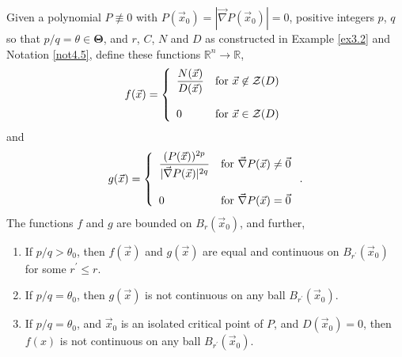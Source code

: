 \documentclass[10pt,a4paper]{amsart}
\newcommand{\re}{\mathbb{R}}
\newcommand{\vv}{\mathcal{Z}}
\begin{document}
\begin{thm}\label{thm3.3}
  Given a polynomial $P\not\equiv0$ with $P(\vec x_0)=|\vec\nabla P(\vec x_0)|=0$, positive integers $p$, $q$ so that  $p/q=\theta\in{\mathbf\Theta}$, and $r$, $C$, $N$ and $D$ as constructed in Example {\rm{\ref{ex3.2}}} and Notation {\rm{\ref{not4.5}}}, define these functions $\re^n\to\re$,
    $$f(\vec x)=\left\{\begin{array}{ll}{\displaystyle{\frac{N(\vec x)}{D(\vec x)}}} & \mbox{\rm{for} $\vec x\not\in\vv(D)$}\\ & \\0& \mbox{\rm{for} $\vec x\in\vv(D)$} \end{array}\right.$$
and 
$$g(\vec x)=\left\{\begin{array}{ll}{\displaystyle{\frac{(P(\vec x))^{2p}}{|\vec\nabla P(\vec x)|^{2q}}}} & \mbox{\rm{for} $\vec\nabla P(\vec x)\ne\vec0$}\\ & \\0& \mbox{\rm{for} $\vec\nabla P(\vec x)=\vec0$} \end{array}\right..$$
The functions $f$ and $g$ are bounded on $B_{r}(\vec x_0)$, and further,
\begin{enumerate}
  \item If $p/q>\theta_0$, then $f(\vec x)$ and $g(\vec x)$ are equal and continuous on $B_{r^\prime}(\vec x_0)$ for some $r^\prime\le r$.

  \item If $p/q=\theta_0$, then $g(\vec x)$ is not continuous on any ball $B_{r^\prime}(\vec x_0)$.

  \item If $p/q=\theta_0$, and $\vec x_0$ is an isolated critical point of $P$, and $D(\vec x_0)=0$, then $f(x)$  is not continuous on any ball $B_{r^\prime}(\vec x_0)$.
  \end{enumerate}
\end{thm}
\end{document}
